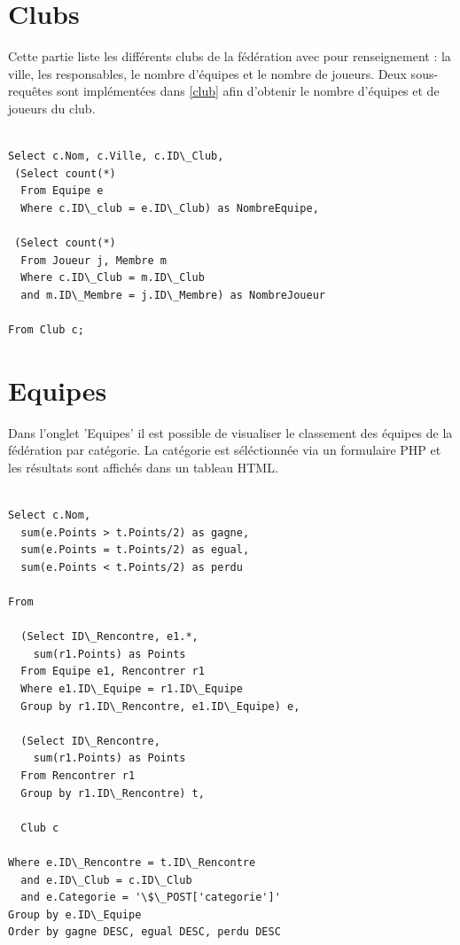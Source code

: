 \documentclass[a4paper»,8pt,french,fleqn]{report}
\begin{document}
\section{Clubs}

Cette partie liste les différents clubs de la fédération avec pour renseignement : la ville, les responsables, le nombre d'équipes et le nombre de joueurs. Deux sous-requêtes sont implémentées dans \ref{club} afin d'obtenir le nombre d'équipes et de joueurs du club. 

\begin{lstlisting}

Select c.Nom, c.Ville, c.ID\_Club,
 (Select count(*) 
  From Equipe e
  Where c.ID\_club = e.ID\_Club) as NombreEquipe,

 (Select count(*) 
  From Joueur j, Membre m
  Where c.ID\_Club = m.ID\_Club
  and m.ID\_Membre = j.ID\_Membre) as NombreJoueur

From Club c;
\end{lstlisting}

\section{Equipes}

Dans l'onglet 'Equipes' il est possible de visualiser le classement des équipes de la fédération par catégorie. La catégorie est séléctionnée via un formulaire PHP et les résultats sont affichés dans un tableau HTML.

\begin{lstlisting}

Select c.Nom,
  sum(e.Points > t.Points/2) as gagne,
  sum(e.Points = t.Points/2) as egual,
  sum(e.Points < t.Points/2) as perdu
  
From
  
  (Select ID\_Rencontre, e1.*,
    sum(r1.Points) as Points
  From Equipe e1, Rencontrer r1
  Where e1.ID\_Equipe = r1.ID\_Equipe
  Group by r1.ID\_Rencontre, e1.ID\_Equipe) e,

  (Select ID\_Rencontre,
    sum(r1.Points) as Points
  From Rencontrer r1
  Group by r1.ID\_Rencontre) t,
  
  Club c

Where e.ID\_Rencontre = t.ID\_Rencontre
  and e.ID\_Club = c.ID\_Club
  and e.Categorie = '\$\_POST['categorie']'
Group by e.ID\_Equipe
Order by gagne DESC, egual DESC, perdu DESC

\end{lstlisting}
\end{document}
